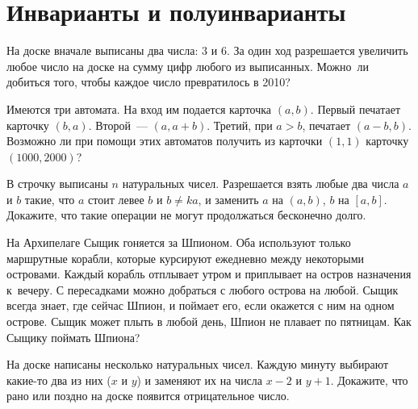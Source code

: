 

\section*{Инварианты и полуинварианты}


\begin{problems}

\item
На доске вначале выписаны два числа: $3$ и $6$.
За один ход разрешается увеличить любое число на доске на сумму цифр любого из
выписанных.
Можно~ли добиться того, чтобы каждое число превратилось в 2010?

\item
Имеются три автомата.
На вход им подается карточка $(a, b)$.
Первый печатает карточку $(b, a)$.
Второй~--- $(a, a + b)$.
Третий, при $a > b$, печатает $(a - b, b)$.
Возможно ли при помощи этих автоматов получить из карточки $(1, 1)$ карточку
$(1000, 2000)$?

\item
В строчку выписаны $n$ натуральных чисел.
Разрешается взять любые два числа $a$ и $b$ такие, что $a$ стоит левее $b$ и
$b \neq k a$, и заменить $a$ на $(a, b)$, $b$ на $[a, b]$.
Докажите, что такие операции не могут продолжаться бесконечно долго.

\item
На Архипелаге Сыщик гоняется за Шпионом.
Оба используют только маршрутные корабли, которые курсируют ежедневно между
некоторыми островами.
Каждый корабль отплывает утром и приплывает на остров назначения к~вечеру.
С пересадками можно добраться с любого острова на любой.
Сыщик всегда знает, где сейчас Шпион, и поймает его, если окажется с ним на
одном острове.
Сыщик может плыть в любой день, Шпион не плавает по пятницам.
Как Сыщику поймать Шпиона?

\item
На доске написаны несколько натуральных чисел.
Каждую минуту выбирают какие-то два из них ($x$ и $y$) и заменяют их на числа
$x - 2$ и $y + 1$.
Докажите, что рано или поздно на доске появится отрицательное число.


\end{problems}
